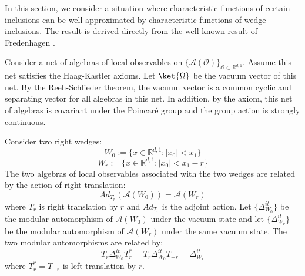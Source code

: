 \documentclass[a4paper,11pt]{article}
\theoremstyle{definition}
\theoremstyle{remark}
\begin{document}
In this section, we consider a situation where characteristic functions of certain inclusions can be well-approximated by characteristic functions of wedge inclusions. The result is derived directly from the well-known result of Fredenhagen \cite{fredenhagen}.

Consider a net of algebras of local observables on $\{\mathcal{A}(\mathcal{O})\}_{\mathcal{O}\subset\mathbb{R}^{d,1}}$. Assume this net satisfies the Haag-Kastler axioms. Let $\ket{\Omega}$ be the vacuum vector of this net. By the Reeh-Schlieder theorem, the vacuum vector is a common cyclic and separating vector for all algebras in this net. In addition, by the axiom, this net of algebras is covariant under the Poincaré group and the group action is strongly continuous.

Consider two right wedges:
\begin{equation}
    W_0 := \{x\in\mathbb{R}^{d,1}: |x_0| < x_1\}
\end{equation}
\begin{equation}
    W_{r} := \{x\in\mathbb{R}^{d,1}: |x_0 | < x_1 - r \}
\end{equation}
The two algebras of local observables associated with the two wedges are related by the action of right translation:
\begin{equation}
    Ad_{T_r}(\mathcal{A}(W_0)) = \mathcal{A}(W_r)
\end{equation}
where $T_r$ is right translation by $r$ and $Ad_{T_r}$ is the adjoint action. Let $\{\Delta_{W_0}^{it}\}$ be the modular automorphism of $\mathcal{A}(W_0)$ under the vacuum state and let $\{\Delta_{W_r}^{it}\}$ be the modular automorphism of $\mathcal{A}(W_r)$ under the same vacuum state. The two modular automorphisms are related by:
\begin{equation}
    T_r\Delta_{W_0}^{it}T_r^* = T_r\Delta_{W_0}^{it}T_{-r} = \Delta^{it}_{W_r}
\end{equation}
where $T_r^* = T_{-r}$ is left translation by $r$.
\end{document}
